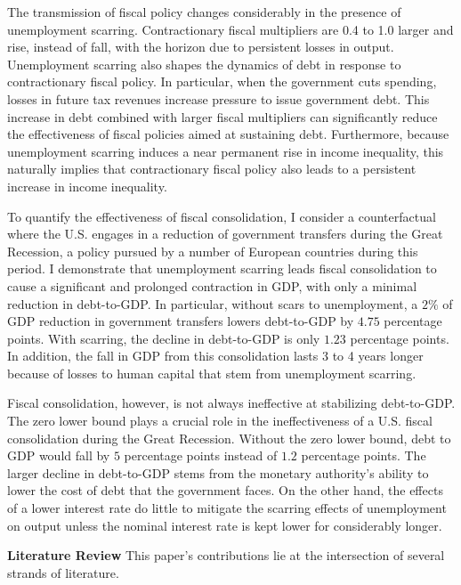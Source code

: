 The transmission of fiscal policy changes considerably in the presence of unemployment scarring. Contractionary fiscal multipliers are 0.4 to 1.0 larger and rise, instead of fall, with the horizon due to persistent losses in output. Unemployment scarring also shapes the dynamics of debt in response to contractionary fiscal policy. In particular, when the government cuts spending, losses in future tax revenues increase pressure to issue government debt. This increase in debt combined with larger fiscal multipliers can significantly reduce the effectiveness of fiscal policies aimed at sustaining debt. Furthermore, because unemployment scarring induces a near permanent rise in income inequality, this naturally implies that contractionary fiscal policy also leads to a persistent increase in income inequality.


To quantify the effectiveness of fiscal consolidation, I consider a counterfactual where the U.S. engages in a reduction of government transfers during the Great Recession, a policy pursued by a number of European countries during this period. I demonstrate that unemployment scarring leads fiscal consolidation to cause a significant and prolonged contraction in GDP, with only a minimal reduction in debt-to-GDP. In particular, without scars to unemployment, a  $2\%$ of GDP reduction in government transfers lowers debt-to-GDP by $4.75$ percentage points. With scarring, the decline in debt-to-GDP is only $1.23$ percentage points. In addition, the fall in GDP from this consolidation lasts 3 to 4 years longer because of losses to human capital that stem from unemployment scarring.


Fiscal consolidation, however, is not always ineffective at stabilizing debt-to-GDP. The zero lower bound plays a crucial role in the ineffectiveness of a U.S. fiscal consolidation during the Great Recession. Without the zero lower bound, debt to GDP would fall by $5$ percentage points instead of $1.2$ percentage points. The larger decline in debt-to-GDP stems from the monetary authority's ability to lower the cost of debt that the government faces. On the other hand, the effects of a lower interest rate do little to mitigate the scarring effects of unemployment on output unless the nominal interest rate is kept lower for considerably longer. 

\textbf{Literature Review} This paper's contributions lie at the intersection of several strands of literature. 

